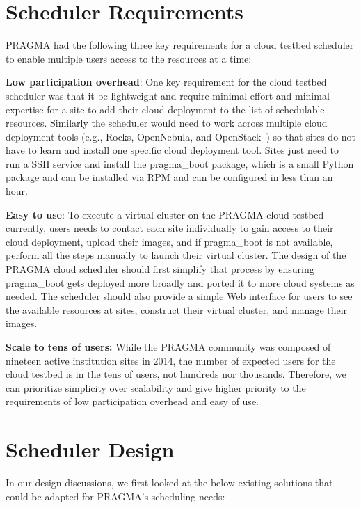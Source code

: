 \documentclass{acm_proc_article-sp}
\begin{document}
\section{Scheduler Requirements}

PRAGMA had the following three key requirements for a cloud testbed scheduler to enable multiple users access to the resources at a time:

\textbf{Low participation overhead}:  One key requirement for the cloud testbed scheduler was that it be lightweight and require  minimal effort and minimal expertise for a site to add their cloud deployment to the list of schedulable resources.   Similarly the scheduler would need to work across multiple cloud deployment tools (e.g., Rocks, OpenNebula, and OpenStack~\cite{openstack}) so that sites do not have to learn and install one specific cloud deployment tool.  Sites  just need to run a SSH service and install the pragma\_boot package, which is a small Python package and can be installed via RPM and can be configured in less than an hour.

\textbf{Easy to use}:  To execute a virtual cluster on the PRAGMA cloud testbed currently, users needs to contact each site individually to gain access to their cloud deployment, upload their images, and if pragma\_boot is not available, perform all the steps manually to launch their virtual cluster.   The design of the PRAGMA cloud scheduler should first simplify that process by ensuring pragma\_boot gets deployed more broadly and ported it to more cloud systems as needed.   The scheduler should also provide a simple Web interface for users to see the available resources at sites, construct their virtual cluster, and manage their images.

\textbf{Scale to tens of users:}  While the PRAGMA community was composed of nineteen active institution sites in 2014, the number of expected users for the cloud testbed is in the tens of users, not hundreds nor thousands.  Therefore, we can prioritize simplicity over scalability and give higher priority to the requirements of low participation overhead and easy of use.

\section{Scheduler Design}
\label{Sec:Design}

In our design discussions, we first looked at the below existing solutions that could be adapted for PRAGMA's scheduling needs:
\end{document}
